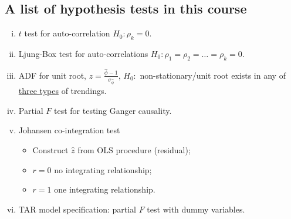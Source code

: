 \documentclass[11pt]{article}
\begin{document}
		\subsection{A list of hypothesis tests in this course}
		\par
		\begin{enumerate}[(i)]
			\item $t$ test for auto-correlation $H_0: \rho_k = 0$.
			\item Ljung-Box test for auto-correlations $H_0: \rho_1 = \rho_2 = \dots = \rho_k = 0$.
			\item ADF for unit root, $z = \frac{\hat{\phi}-1}{\sigma_{\hat{\phi}}}$, $H_0:$ non-stationary/unit root exists in any of \ul{three types} of trendings.
			\item Partial $F$ test for testing Ganger causality.
			\item Johansen co-integration test
			\begin{itemize}
				\item Construct $\hat{z}$ from OLS procedure (residual);
				\item $r=0$ no integrating relationship;
				\item $r=1$ one integrating relationship.
			\end{itemize}
			\item TAR model specification: partial $F$ test with dummy variables.
		\end{enumerate}
\end{document}
